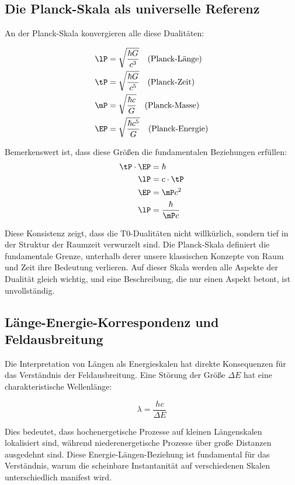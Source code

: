 	\subsection{Die Planck-Skala als universelle Referenz}
	
	An der Planck-Skala konvergieren alle diese Dualitäten:
	
	\begin{align}
		\lP &= \sqrt{\frac{\hbar G}{c^3}} \quad \text{(Planck-Länge)} \\
		\tP &= \sqrt{\frac{\hbar G}{c^5}} \quad \text{(Planck-Zeit)} \\
		\mP &= \sqrt{\frac{\hbar c}{G}} \quad \text{(Planck-Masse)} \\
		\EP &= \sqrt{\frac{\hbar c^5}{G}} \quad \text{(Planck-Energie)}
	\end{align}
	
	Bemerkenswert ist, dass diese Größen die fundamentalen Beziehungen erfüllen:
	\begin{align}
		\tP \cdot \EP &= \hbar \\
		\lP &= c \cdot \tP \\
		\EP &= \mP c^2 \\
		\lP &= \frac{\hbar}{\mP c}
	\end{align}
	
	Diese Konsistenz zeigt, dass die T0-Dualitäten nicht willkürlich, sondern tief in der Struktur der Raumzeit verwurzelt sind. Die Planck-Skala definiert die fundamentale Grenze, unterhalb derer unsere klassischen Konzepte von Raum und Zeit ihre Bedeutung verlieren. Auf dieser Skala werden alle Aspekte der Dualität gleich wichtig, und eine Beschreibung, die nur einen Aspekt betont, ist unvollständig.
	
	\subsection{Länge-Energie-Korrespondenz und Feldausbreitung}
	
	Die Interpretation von Längen als Energieskalen hat direkte Konsequenzen für das Verständnis der Feldausbreitung. Eine Störung der Größe $\Delta E$ hat eine charakteristische Wellenlänge:
	
	\begin{equation}
		\lambda = \frac{hc}{\Delta E}
	\end{equation}
	
	Dies bedeutet, dass hochenergetische Prozesse auf kleinen Längenskalen lokalisiert sind, während niederenergetische Prozesse über große Distanzen ausgedehnt sind. Diese Energie-Längen-Beziehung ist fundamental für das Verständnis, warum die scheinbare Instantanität auf verschiedenen Skalen unterschiedlich manifest wird.
	
